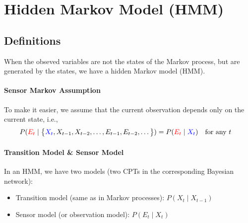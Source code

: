 \documentclass[10pt,UTF8]{article}
\theoremstyle{definition}
\newtheorem{definition inner}{Definition}[section]
\theoremstyle{definition}
\newtheorem{theorem inner}{Theorem}[section]
\theoremstyle{definition}
\newtheorem*{proof inner}{\textit{Proof}}
\theoremstyle{plain}
\newtheorem{tip inner}{Tip}[section]
\theoremstyle{remark}
\begin{document}
\section{Hidden Markov Model (HMM)}

\subsection{Definitions}

When the obseved variables are not the states of the Markov process,
but are generated by the states, we have a hidden Markov model (HMM).

\paragraph*{Sensor Markov Assumption}
To make it easier,
we assume that the current observation depends
only on the current state, i.e.,
\begin{equation*}
  P(\textcolor{red}{E_t} \mid \big \{
      \textcolor{blue}{X_t}, X_{t-1}, X_{t-2},
  \ldots, E_{t-1}, E_{t-2}, \ldots \big \})
  = P(\textcolor{red}{E_t} \mid \textcolor{blue}{X_t})
  \qq{for any \(t\)}
\end{equation*}

\paragraph*{Transition Model \& Sensor Model}
In an HMM, we have two models
(two CPTs in the corresponding Bayesian network):
\begin{itemize}
  \item Transition model (same as in Markov processes):
    \(P(X_t \mid X_{t-1})\)
  \item Sensor model (or observation model): \(P(E_t \mid X_t)\)
\end{itemize}
\end{document}
